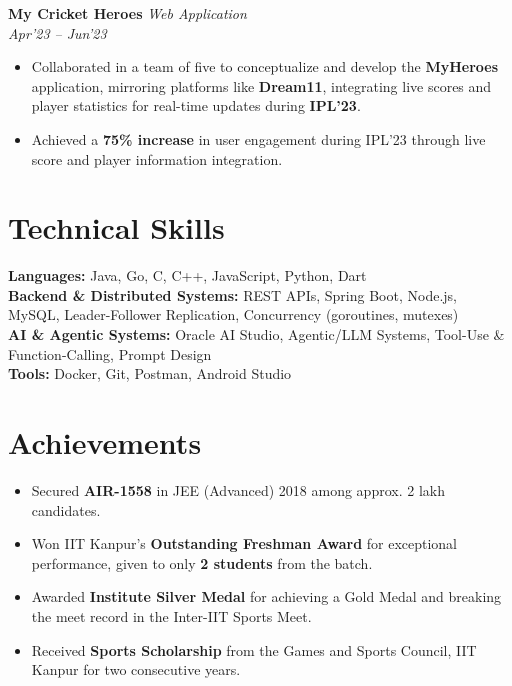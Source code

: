 \documentclass[10pt,a4paper]{article}
\newcommand{\resumeItem}[1]{\item[\textcolor{primary}{\textbullet}] #1}
\newcommand{\skillCategory}[2]{\textbf{#1:} #2}
\begin{document}
\vspace{1pt}
\textbf{My Cricket Heroes} \hfill \textit{Web Application}\\
\textit{Apr'23 -- Jun'23}
\begin{itemize}[leftmargin=1.05em, nosep, topsep=0pt, itemsep=0pt, parsep=0pt]
    \resumeItem{Collaborated in a team of five to conceptualize and develop the \textbf{MyHeroes} application, mirroring platforms like \textbf{Dream11}, integrating live scores and player statistics for real-time updates during \textbf{IPL'23}.}
    \resumeItem{Achieved a \textbf{75\% increase} in user engagement during IPL'23 through live score and player information integration.}
\end{itemize}

\section{Technical Skills}
\small
\skillCategory{Languages}{Java, Go, C, C++, JavaScript, Python, Dart}\\[1pt]
\skillCategory{Backend \& Distributed Systems}{REST APIs, Spring Boot, Node.js, MySQL, Leader-Follower Replication, Concurrency (goroutines, mutexes)}\\[1pt]
\skillCategory{AI \& Agentic Systems}{Oracle AI Studio, Agentic/LLM Systems, Tool-Use \& Function-Calling, Prompt Design}\\[1pt]
\skillCategory{Tools}{Docker, Git, Postman, Android Studio}

\section{Achievements}
\small
\begin{itemize}[leftmargin=1.05em, nosep, topsep=0pt, itemsep=0pt, parsep=0pt]
    \resumeItem{Secured \textbf{AIR-1558} in JEE (Advanced) 2018 among approx. 2 lakh candidates.}
\resumeItem{Won IIT Kanpur's \textbf{Outstanding Freshman Award} for exceptional performance, given to only \textbf{2 students} from the batch.}
    \resumeItem{Awarded \textbf{Institute Silver Medal} for achieving a Gold Medal and breaking the meet record in the Inter-IIT Sports Meet.}
    \resumeItem{Received \textbf{Sports Scholarship} from the Games and Sports Council, IIT Kanpur for two consecutive years.}
\end{itemize}
\end{document}
